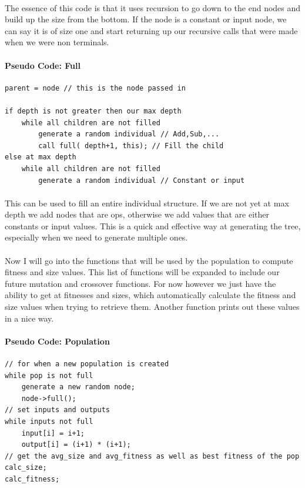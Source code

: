 \documentclass[paper=a4, fontsize=11pt]{scrartcl} %
\numberwithin{equation}{section} %
\numberwithin{figure}{section} %
\numberwithin{table}{section} %
\begin{document}
\paragraph{} The essence of this code is that it uses recursion to go down to the end nodes and build up the size from the bottom. If the node is a constant or input node, we can say it is of size one and start returning up our recursive calls that were made when we were non terminals.

\paragraph{Pseudo Code: Full}
\begin{verbatim}
parent = node // this is the node passed in

if depth is not greater then our max depth
    while all children are not filled
        generate a random individual // Add,Sub,...
        call full( depth+1, this); // Fill the child
else at max depth
    while all children are not filled
        generate a random individual // Constant or input
\end{verbatim}

\paragraph{} This can be used to fill an entire individual structure. If we are not yet at max depth we add nodes that are ops, otherwise we add values that are either constants or input values. This is a quick and effective way at generating the tree, especially when we need to generate multiple ones.

\paragraph{} Now I will go into the functions that will be used by the population to compute fitness and size values. This list of functions will be expanded to include our future mutation and crossover functions. For now however we just have the ability to get at fitnesses and sizes, which automatically calculate the fitness and size values when trying to retrieve them. Another function prints out these values in a nice way.

\paragraph{Pseudo Code: Population}
\begin{verbatim}
// for when a new population is created
while pop is not full
    generate a new random node;
    node->full();
// set inputs and outputs
while inputs not full
    input[i] = i+1;
    output[i] = (i+1) * (i+1);
// get the avg_size and avg_fitness as well as best fitness of the pop
calc_size;
calc_fitness;
\end{verbatim}
\end{document}
